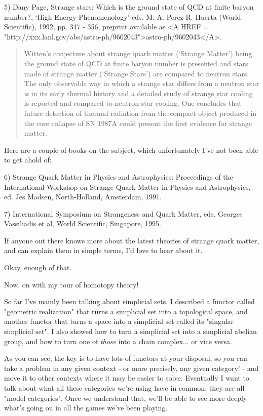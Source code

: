 5) Dany Page, Strange stars: Which is the ground state of QCD at finite 
baryon number?, `High Energy Phenomenology' eds. M. A. Perez \text{\&}  R. Huerta 
(World Scientific), 1992, pp. 347 - 356, preprint available as 
<A HREF = "http://xxx.lanl.gov/abs/astro-ph/9602043">astro-ph/9602043</A>.


\begin{quote}
  Witten's conjecture about strange quark matter (`Strange Matter') being 
  the ground state of QCD at finite baryon number is presented and stars 
  made of strange matter (`Strange Stars') are compared to neutron stars. 
  The only observable way in which a strange star differs from a neutron 
  star is in its early thermal history and a detailed study of strange star 
  cooling is reported and compared to neutron star cooling. One concludes 
  that future detection of thermal radiation from the compact object 
  produced in the core collapse of SN 1987A could present the first 
  evidence for strange matter. 

\end{quote}
Here are a couple of books on the subject, which unfortunately I've
not been able to get ahold of:

6) Strange Quark Matter in Physics and Astrophysics: Proceedings of the
International Workshop on Strange Quark Matter in Physics and Astrophysics,
ed. Jes Madsen, North-Holland, Amsterdam, 1991.

7) International Symposium on Strangeness and Quark Matter, eds. Georges 
Vassiliadis et al, World Scientific, Singapore, 1995.

If anyone out there knows more about the latest theories of strange quark
matter, and can explain them in simple terms, I'd love to hear about it.

Okay, enough of that.

Now, on with my tour of homotopy theory!

So far I've mainly been talking about simplicial sets.  I described a
functor called "geometric realization" that turns a simplicial set into
a topological space, and another functor that turns a space into a
simplicial set called its "singular simplicial set".  I also showed how
to turn a simplicial set into a simplicial abelian group, and how
to turn one of \emph{those} into a chain complex... or vice versa.

As you can see, the key is to have lots of functors at your disposal,
so you can take a problem in any given context - or more precisely,
any given category! - and move it to other contexts where it may be
easier to solve.  Eventually I want to talk about what all these
categories we're using have in common: they are all "model
categories".  Once we understand that, we'll be able to see more
deeply what's going on in all the games we've been playing.

